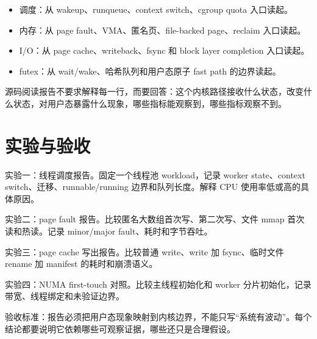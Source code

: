 \begin{itemize}
  \item 调度：从 wakeup、runqueue、context switch、cgroup quota 入口读起。
  \item 内存：从 page fault、VMA、匿名页、file-backed page、reclaim 入口读起。
  \item I/O：从 page cache、writeback、fsync 和 block layer completion 入口读起。
  \item futex：从 wait/wake、哈希队列和用户态原子 fast path 的边界读起。
\end{itemize}

源码阅读报告不要求解释每一行，而要回答：这个内核路径接收什么状态，改变什么状态，对用户态暴露什么现象，哪些指标能观察到，哪些指标观察不到。

\section{实验与验收}

实验一：线程调度报告。固定一个线程池 workload，记录 worker state、context switch、迁移、runnable/running 边界和队列长度。解释 CPU 使用率低或高的具体原因。

实验二：page fault 报告。比较匿名大数组首次写、第二次写、文件 mmap 首次读和热读。记录 minor/major fault、耗时和字节吞吐。

实验三：page cache 写出报告。比较普通 write、write 加 fsync、临时文件 rename 加 manifest 的耗时和崩溃语义。

实验四：NUMA first-touch 对照。比较主线程初始化和 worker 分片初始化，记录带宽、线程绑定和未验证边界。

验收标准：报告必须把用户态现象映射到内核边界，不能只写“系统有波动”。每个结论都要说明它依赖哪些可观察证据，哪些还只是合理假设。
